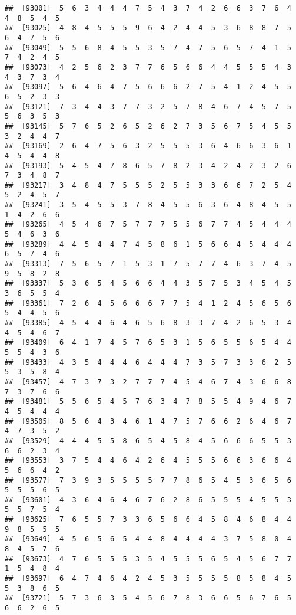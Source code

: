 \documentclass[
]{book}
\begin{document}
\begin{verbatim}
##  [93001]  5  6  3  4  4  4  7  5  4  3  7  4  2  6  6  3  7  6  4  4  8  5  4  5
##  [93025]  4  8  4  5  5  5  9  6  4  2  4  4  5  3  6  8  8  7  5  6  4  7  5  6
##  [93049]  5  5  6  8  4  5  5  3  5  7  4  7  5  6  5  7  4  1  5  7  4  2  4  5
##  [93073]  4  2  5  6  2  3  7  7  6  5  6  6  4  4  5  5  5  4  3  4  3  7  3  4
##  [93097]  5  6  4  6  4  7  5  6  6  6  2  7  5  4  1  2  4  5  5  6  5  2  3  3
##  [93121]  7  3  4  4  3  7  7  3  2  5  7  8  4  6  7  4  5  7  5  5  6  3  5  3
##  [93145]  5  7  6  5  2  6  5  2  6  2  7  3  5  6  7  5  4  5  5  3  2  4  4  7
##  [93169]  2  6  4  7  5  6  3  2  5  5  5  3  6  4  6  6  3  6  1  4  5  4  4  8
##  [93193]  5  4  5  4  7  8  6  5  7  8  2  3  4  2  4  2  3  2  6  7  3  4  8  7
##  [93217]  3  4  8  4  7  5  5  5  2  5  5  3  3  6  6  7  2  5  4  5  2  4  5  7
##  [93241]  3  5  4  5  5  3  7  8  4  5  5  6  3  6  4  8  4  5  5  1  4  2  6  6
##  [93265]  4  5  4  6  7  5  7  7  7  5  5  6  7  7  4  5  4  4  4  5  4  6  3  6
##  [93289]  4  4  5  4  4  7  4  5  8  6  1  5  6  6  4  5  4  4  4  6  5  7  4  6
##  [93313]  7  5  6  5  7  1  5  3  1  7  5  7  7  4  6  3  7  4  5  9  5  8  2  8
##  [93337]  5  3  6  5  4  5  6  6  4  4  3  5  7  5  3  4  5  4  5  3  6  5  5  4
##  [93361]  7  2  6  4  5  6  6  6  7  7  5  4  1  2  4  5  6  5  6  5  4  4  5  6
##  [93385]  4  5  4  4  6  4  6  5  6  8  3  3  7  4  2  6  5  3  4  4  5  4  6  7
##  [93409]  6  4  1  7  4  5  7  6  5  3  1  5  6  5  5  6  5  4  4  5  5  4  3  6
##  [93433]  4  3  5  4  4  4  6  4  4  4  7  3  5  7  3  3  6  2  5  5  3  5  8  4
##  [93457]  4  7  3  7  3  2  7  7  7  4  5  4  6  7  4  3  6  6  8  7  3  7  6  6
##  [93481]  5  5  6  5  4  5  7  6  3  4  7  8  5  5  4  9  4  6  7  4  5  4  4  4
##  [93505]  8  5  6  4  3  4  6  1  4  7  5  7  6  6  2  6  4  6  7  4  7  3  5  2
##  [93529]  4  4  4  5  5  8  6  5  4  5  8  4  5  6  6  6  5  5  3  6  6  2  3  4
##  [93553]  3  7  5  4  4  6  4  2  6  4  5  5  5  6  6  3  6  6  4  5  6  6  4  2
##  [93577]  7  3  9  3  5  5  5  5  7  7  8  6  5  4  5  3  6  5  6  5  5  5  6  5
##  [93601]  4  3  6  4  6  4  6  7  6  2  8  6  5  5  5  4  5  5  3  5  5  7  5  4
##  [93625]  7  6  5  5  7  3  3  6  5  6  6  4  5  8  4  6  8  4  4  9  8  5  5  5
##  [93649]  4  5  6  5  6  5  4  4  8  4  4  4  4  3  7  5  8  0  4  8  4  5  7  6
##  [93673]  4  7  6  5  5  5  3  5  4  5  5  5  6  5  4  5  6  7  7  1  5  4  8  4
##  [93697]  6  4  7  4  6  4  2  4  5  3  5  5  5  5  8  5  8  4  5  5  3  8  6  5
##  [93721]  5  7  3  6  3  5  4  5  6  7  8  3  6  6  5  6  7  6  5  6  6  2  6  5

\end{verbatim}
\end{document}
